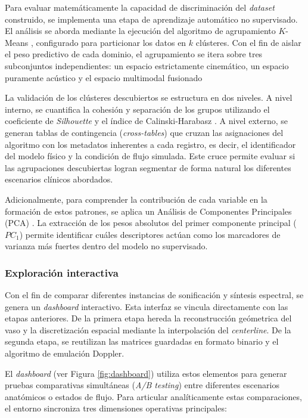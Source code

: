 Para evaluar matemáticamente la capacidad de discriminación del \textit{dataset} construido, se implementa una etapa de aprendizaje automático no supervisado. El análisis se aborda mediante la ejecución del algoritmo de agrupamiento $K$-Means \cite{Jain2010}, configurado para particionar los datos en $k$ clústeres. Con el fin de aislar el peso predictivo de cada dominio, el agrupamiento se itera sobre tres subconjuntos independientes: un espacio estrictamente cinemático, un espacio puramente acústico y el espacio multimodal fusionado

La validación de los clústeres descubiertos se estructura en dos niveles. A nivel interno, se cuantifica la cohesión y separación de los grupos utilizando el coeficiente de \textit{Silhouette} \cite{Rousseeuw1987} y el índice de Calinski-Harabasz \cite{Calinski1974}. A nivel externo, se generan tablas de contingencia (\textit{cross-tables}) que cruzan las asignaciones del algoritmo con los metadatos inherentes a cada registro, es decir, el identificador del modelo físico y la condición de flujo simulada. Este cruce permite evaluar si las agrupaciones descubiertas logran segmentar de forma natural los diferentes escenarios clínicos abordados.

Adicionalmente, para comprender la contribución de cada variable en la formación de estos patrones, se aplica un Análisis de Componentes Principales (PCA) \cite{Jolliffe2016}. La extracción de los pesos absolutos del primer componente principal ($PC_1$) permite identificar cuáles descriptores actúan como los marcadores de varianza más fuertes dentro del modelo no supervisado.

\subsubsection{Exploración interactiva}

Con el fin de comparar diferentes instancias de sonificación y síntesis espectral, se genera un \textit{dashboard} interactivo. Esta interfaz se vincula directamente con las etapas anteriores. De la primera etapa hereda la reconstrucción geómetrica del vaso y la discretización espacial mediante la interpolación del \textit{centerline}. De la segunda etapa, se reutilizan las matrices guardadas en formato binario y el algoritmo de emulación Doppler. 

El \textit{dashboard} (ver Figura \ref{fig:dashboard}) utiliza estos elementos para generar pruebas comparativas simultáneas (\textit{A/B testing}) entre diferentes escenarios anatómicos o estados de flujo. Para articular analíticamente estas comparaciones, el entorno sincroniza tres dimensiones operativas principales:

